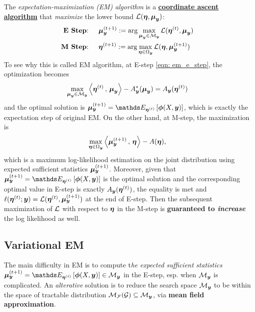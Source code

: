 \documentclass[11pt]{article}
\begin{document}
The \emph{expectation-maximization (EM) algorithm} is a \underline{\textbf{coordinate ascent algorithm}} that \emph{maximize} the lower bound ${\mathcal L}(\boldsymbol{\eta}, \boldsymbol{\mu}_{\boldsymbol{y}})$:
\begin{align}
\text{\textbf{E Step}: }\quad  &\boldsymbol{\mu}_{\boldsymbol{y}}^{(t+1)} := \arg\max_{\boldsymbol{\mu}_{\boldsymbol{y}} \in {\mathcal M}_{\boldsymbol{y}}}  {\mathcal L}(\boldsymbol{\eta}^{(t)}, \boldsymbol{\mu}_{\boldsymbol{y}})   \label{eqn: em_e_step}\\
\text{\textbf{M Step}: }\quad &\boldsymbol{\eta}^{(t+1)} := \arg\max_{\boldsymbol{\eta} \in \Omega_{\boldsymbol{y}}}  {\mathcal L}(\boldsymbol{\eta}, \boldsymbol{\mu}_{\boldsymbol{y}}^{(t+1)} )  \label{eqn: em_m_step}
\end{align} To see why this is called EM algorithm, at E-step \eqref{eqn: em_e_step}, the optimization becomes 
\begin{align*}
\max_{\boldsymbol{\mu}_{\boldsymbol{y}} \in {\mathcal M}_{\boldsymbol{y}}}  \left\langle \boldsymbol{\eta}^{(t)}\,,\, \boldsymbol{\mu}_{\boldsymbol{y}} \right\rangle - A_{\boldsymbol{y}}^{*}(\boldsymbol{\mu}_{\boldsymbol{y}}) = A_{\boldsymbol{y}}(\boldsymbol{\eta}^{(t)})
\end{align*} and the optimal solution is $\mb{\mu}_{\mb{y}}^{(t+1)} =  \E{\mb{\eta}^{(t)}}{\mb{\phi}(X, \mb{y})}$, which is exactly the expectation step of original EM. On the other hand, at M-step, the maximization is 
\begin{align*}
\max_{\boldsymbol{\eta} \in \Omega_{\boldsymbol{y}}} \left\langle \boldsymbol{\mu}_{\boldsymbol{y}}^{(t+1)}\,,\, \boldsymbol{\eta} \right\rangle  - A(\boldsymbol{\eta}), 
\end{align*}  which is a maximum log-likelihood estimation on the joint distribution using expected sufficient statistics $\boldsymbol{\mu}_{\boldsymbol{y}}^{(t+1)}$. Moreover, given that $\mb{\mu}_{\mb{y}}^{(t+1)} =  \E{\mb{\eta}^{(t)}}{\mb{\phi}(X, \mb{y})}$ is the optimal solution and the corresponding optimal value in E-step is exactly $ A_{\boldsymbol{y}}(\boldsymbol{\eta}^{(t)})$, the equality is met and $\ell(\boldsymbol{\eta}^{(t)} ;\boldsymbol{y}) = {\mathcal L}(\boldsymbol{\eta}^{(t)}, \boldsymbol{\mu}_{\boldsymbol{y}}^{(t+1)})$ at the end of E-step. Then the subsequent maximization of ${\mathcal L}$ with respect to $\boldsymbol{\eta}$ in the M-step is \textbf{guaranteed to \emph{increase}} the log likelihood as well.

\subsection{Variational EM}
The main difficulty in EM is to compute t\emph{he expected sufficient statistics} $\mb{\mu}_{\mb{y}}^{(t+1)} =  \E{\mb{\eta}^{(t)}}{\mb{\phi}(X, \mb{y})} \in \cM_{\mb{y}}$ in the E-step, esp. when ${\mathcal M}_{\boldsymbol{y}}$ is complicated. An \emph{alterative} solution is to reduce the search space ${\mathcal M}_{\boldsymbol{y}}$ to be within the space of tractable distribution ${\mathcal M}_{{\mathcal F}}({\mathcal G}) \subseteq {\mathcal M}_{\boldsymbol{y}}$, via \textbf{mean field approximation}. 
\end{document}
